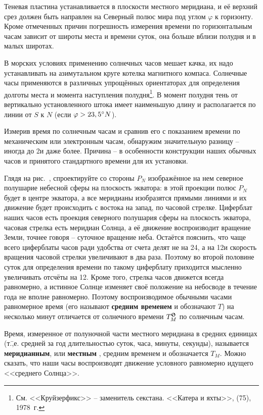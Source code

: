 Теневая пластина устанавливается в плоскости местного меридиана, и её
верхний срез должен быть направлен на Северный полюс мира под углом
$\varphi$ к горизонту. Кроме отмеченных причин погрешность измерения
времени по горизонтальным часам зависит от широты места и времени
суток, она больше вблизи полудня и в малых широтах.

В морских условиях применению солнечных часов мешает качка, их надо
устанавливать на азимутальном круге котелка магнитного
компаса. Солнечные часы применяются в различных упрощённых
ориентаторах для определения долготы места и момента наступления
полудня\footnote{См. <<Круйзерфикс>>\label{cruiserfix} \--- заменитель
  секстана. <<Катера и яхты>>,  (75), 1978~г.}. В момент полудня
тень от вертикально установленного штока имеет наименьшую длину и
располагается по линии от $S$ к $N$ (если $\varphi > 23,5^\circ N$).

Измерив время по солнечным часам и сравнив его с показанием времени по
механическим или электронным часам, обнаружим значительную разницу
\--- иногда до 2\thr и даже более. Причина \--- в особенности
конструкции наших обычных часов и принятого стандартного времени для
их установки.

Глядя на рис.~, спроектируйте со стороны $P_N$ изображённое на
нем северное полушарие небесной сферы на плоскость экватора: в этой
проекции полюс $P_N$ будет в центре экватора, а все меридианы
изобразятся прямыми линиями и их движение будет происходить с востока
на запад, по часовой стрелке. Циферблат наших часов есть проекция
северного полушария сферы на плоскость экватора, часовая стрелка есть
меридиан Солнца, а её движение воспроизводит вращение Земли, точнее
говоря \--- суточное вращение неба. Остаётся пояснить, что чаще всего
циферблаты часов ради удобства от счета делят не на 24\thr, а на
12\thr и скорость вращения часовой стрелки увеличивают в два
раза. Поэтому во второй половине суток для определения времени по
такому циферблату приходится мысленно увеличивать отсчёты на
12\thr. Кроме того, стрелка часов движется всегда равномерно, а
истинное Солнце изменяет своё положение на небосводе в течение года не
вполне равномерно. Поэтому воспроизводимое обычными часами равномерное
время (его называют \textbf{средним временем}%
и обозначают $T$) на
несколько минут отличается от солнечного времени $\TSun_M$ по
солнечным часам.

Время, измеренное от полуночной части местного меридиана в средних
единицах (т.\=,е. средней за год длительностью суток, часа, минуты,
секунды), называется \textbf{меридианным}, или \textbf{местным}%
, средним
временем и обозначается $T_M$. Можно сказать, что наши часы
воспроизводят движение условного равномерно идущего <<среднего
Солнца>>.


